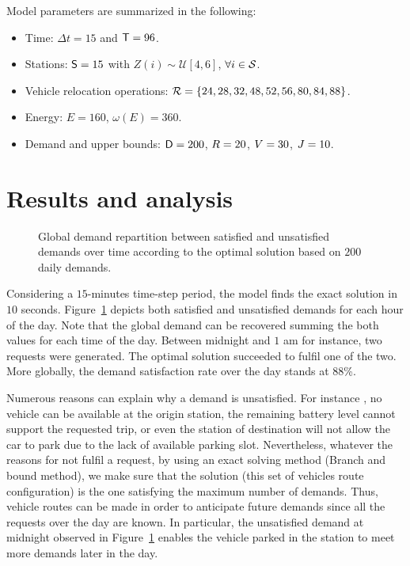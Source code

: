 \medskip\noindent
Model parameters are summarized in the following:
\begin{itemize}
\item Time: $\Delta t = 15$ and $\mathsf{T} = 96$.
\item Stations: $\mathsf{S} = 15$ with $Z(i) \sim \mathcal{U}[4,6]$, $\forall i \in \mathcal{S}$.
\item Vehicle relocation operations: $\mathcal{R} = \{24, 28, 32 ,48, 52, 56, 80, 84, 88\}$.
\item Energy: $E = 160$, $\omega (E) = 360$.
\item Demand and upper bounds: $\mathsf{D} = 200$, $R = 20$, $V = 30$,  $J = 10$.
\end{itemize}


\section{Results and analysis} \label{sec:energyExp:results}

\begin{figure}[t]
\flushleft

\caption{Global demand repartition between satisfied and unsatisfied demands over time according to the optimal solution based on $200$ daily demands.}
\label{fig:plotDemand}
\end{figure}

\medskip
Considering a $15$-minutes time-step period, the model finds the exact solution in $10$ seconds.
Figure~\ref{fig:plotDemand} depicts both satisfied and unsatisfied demands for each hour of the day.
Note that the global demand can be recovered summing the both values for each time of the day.
Between midnight and $1$ am for instance, two requests were generated.
The optimal solution succeeded to fulfil one of the two.
More globally, the demand satisfaction rate over the day stands at $88$\%.

\medskip
Numerous reasons can explain why a demand is unsatisfied.
For instance , no vehicle can be available at the origin station, the remaining battery level cannot support the requested trip, or even the station of destination will not allow the car to park due to the lack of available parking slot.
Nevertheless, whatever the reasons for not fulfil a request, by using an exact solving method (Branch and bound method), we make sure that the solution (\ie this set of vehicles route configuration) is the one satisfying the maximum number of demands.
Thus, vehicle routes can be made in order to anticipate future demands since all the requests over the day are known.
In particular, the unsatisfied demand at midnight observed in Figure~\ref{fig:plotDemand} enables the vehicle parked in the station to meet more demands later in the day.

